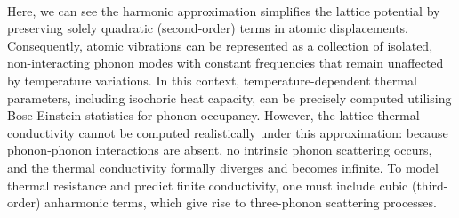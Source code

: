 \paragraph{}
Here, we can see the harmonic approximation simplifies the lattice potential by preserving solely quadratic (second-order) terms in atomic displacements.  Consequently, atomic vibrations can be represented as a collection of isolated, non-interacting phonon modes with constant frequencies that remain unaffected by temperature variations.
In this context, temperature-dependent thermal parameters, including isochoric heat capacity, can be precisely computed utilising Bose-Einstein statistics for phonon occupancy. 
However, the lattice thermal conductivity cannot be computed realistically under this approximation: because phonon-phonon interactions are absent, no intrinsic phonon scattering occurs, and the thermal conductivity formally diverges and becomes infinite. 
To model thermal resistance and predict finite conductivity, one must include cubic (third-order) anharmonic terms, which give rise to three-phonon scattering processes.

